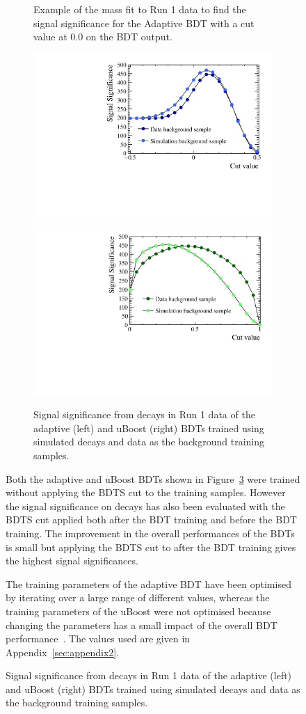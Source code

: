 \begin{figure}[tbp]
\begin{figure}[htbp]
    \caption{Example of the mass fit to \bhh Run 1 data to find the signal significance for the Adaptive BDT with a cut value at 0.0 on the BDT output. }
    \label{fig:massEG}
\end{figure}

\begin{figure}[htbp]
    \centering
        \includegraphics[width=0.49 \textwidth]{./Figs/Selection/BDT_data_MC_comp.pdf}
       \includegraphics[width=0.49 \textwidth]{./Figs/Selection/uBoost_data_MC_comp.pdf}
    \caption{Signal significance from \bhh decays in Run 1 data of the adaptive (left) and uBoost (right) BDTs trained using simulated decays and data as the background training samples.}
    \label{fig:SSelBDTs}
\end{figure}

Both the adaptive and uBoost BDTs shown in Figure~\ref{fig:SSelBDTs} were trained without applying the BDTS cut to the training samples. However the signal significance on \bhh decays has also been evaluated with the BDTS cut applied both after the BDT training and before the BDT training. The improvement in the overall performances of the BDTs is small but applying the BDTS cut to \bhh after the BDT training gives the highest signal significances. 

The training parameters of the adaptive BDT have been optimised by iterating over a large range of different values, whereas the training parameters of the uBoost were not optimised because changing the parameters has a small impact of the overall BDT performance~\cite{Stevens:2013dya}. The values used are given in Appendix~\ref{sec:appendix2}. 


\end{figure}

